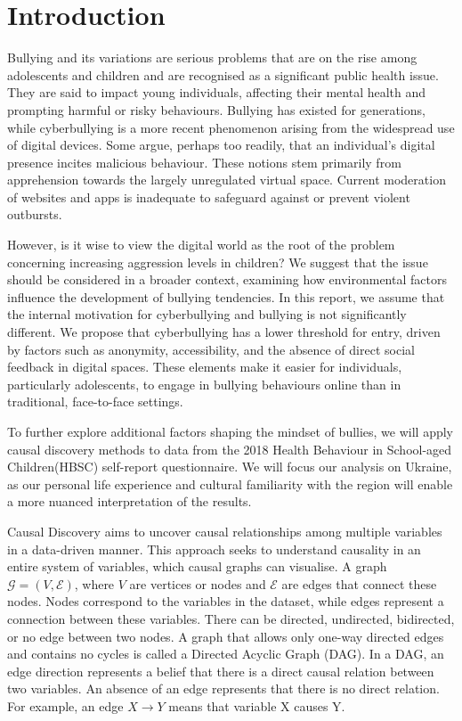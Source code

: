 \section{Introduction}
Bullying and its variations are serious problems that are on the rise among adolescents and children \cite{Zhu2021} and are recognised as a significant public health issue. They are said to impact young individuals, affecting their mental health and prompting harmful or risky behaviours. Bullying has existed for generations, while cyberbullying is a more recent phenomenon arising from the widespread use of digital devices. Some argue, perhaps too readily, that an individual's digital presence incites malicious behaviour. These notions stem primarily from apprehension towards the largely unregulated virtual space. Current moderation of websites and apps is inadequate to safeguard against or prevent violent outbursts.

However, is it wise to view the digital world as the root of the problem concerning increasing aggression levels in children? We suggest that the issue should be considered in a broader context, examining how environmental factors influence the development of bullying tendencies. 
In this report, we assume that the internal motivation for cyberbullying and bullying is not significantly different. We propose that cyberbullying has a lower threshold for entry, driven by factors such as anonymity, accessibility, and the absence of direct social feedback in digital spaces. These elements make it easier for individuals, particularly adolescents, to engage in bullying behaviours online than in traditional, face-to-face settings. 

To further explore additional factors shaping the mindset of bullies, we will apply causal discovery methods to data from the 2018 Health Behaviour in School-aged Children(HBSC) self-report questionnaire. We will focus our analysis on Ukraine, as our personal life experience and cultural familiarity with the region will enable a more nuanced interpretation of the results. 

Causal Discovery aims to uncover causal relationships among multiple variables in a data-driven manner. This approach seeks to understand causality in an entire system of variables, which causal graphs can visualise. A graph $\mathcal{G} = (V, \mathcal{E})$, where $V$ are vertices or nodes and $\mathcal{E}$ are edges that connect these nodes. Nodes correspond to the variables in the dataset, while edges represent a connection between these variables. There can be directed, undirected, bidirected, or no edge between two nodes. A graph that allows only one-way directed edges and contains no cycles is called a Directed Acyclic Graph (DAG). In a DAG, an edge direction represents a belief that there is a direct causal relation between two variables. An absence of an edge represents that there is no direct relation. For example, an edge $X \rightarrow Y$ means that variable X causes Y.

